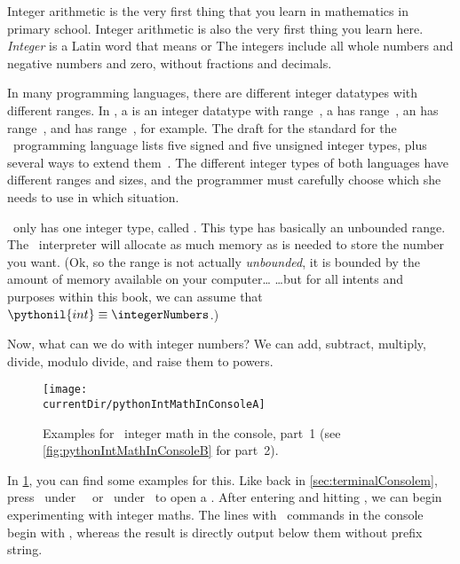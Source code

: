 %
\label{sec:int}%
%
Integer arithmetic is the very first thing that you learn in mathematics in primary school.
Integer arithmetic is also the very first thing you learn here.
\emph{Integer} is a Latin word that means  or 
The integers include all whole numbers and negative numbers and zero, without fractions and decimals.

In many programming languages, there are different integer datatypes with different ranges.
In , a  is an integer datatype with range~, a  has range~, an  has range~, and  has range~, for example.
The draft for the  standard for the ~programming language lists five signed and five unsigned integer types, plus several ways to extend them~\cite{ISOIEC207PLCWDOS}.
The different integer types of both languages have different ranges and sizes, and the programmer must carefully choose which she needs to use in which situation.

\python\ only has one integer type, called .
This type has basically an unbounded range.
The \python\ interpreter will allocate as much memory as is needed to store the number you want.
(Ok, so the range is not actually \emph{unbounded}, it is bounded by the amount of memory available on your computer{\dots} {\dots}but for all intents and purposes within this book, we can assume that~$\pythonil{int}\equiv\integerNumbers$.)

Now, what can we do with integer numbers?
We can add, subtract, multiply, divide, modulo divide, and raise them to powers.

\begin{figure}%
\centering%
\texttt{[image: \\currentDir/pythonIntMathInConsoleA]}%
\caption{Examples for \python\ integer math in the console, part~1 (see \cref{fig:pythonIntMathInConsoleB} for part~2).}%
\label{fig:pythonIntMathInConsoleA}%
\end{figure}%

In \cref{fig:pythonIntMathInConsoleA}, you can find some examples for this.
Like back in \cref{sec:terminalConsolem}, press \ubuntuTerminal\ under \ubuntu\ \linux\ or \windowsTerminal\ under \windows\ to open a .
After entering  and hitting \keys{\enter}, we can begin experimenting with integer maths.
The lines with \python\ commands in the console begin with \pythonil{>>>}, whereas the result is directly output below them without prefix string.

